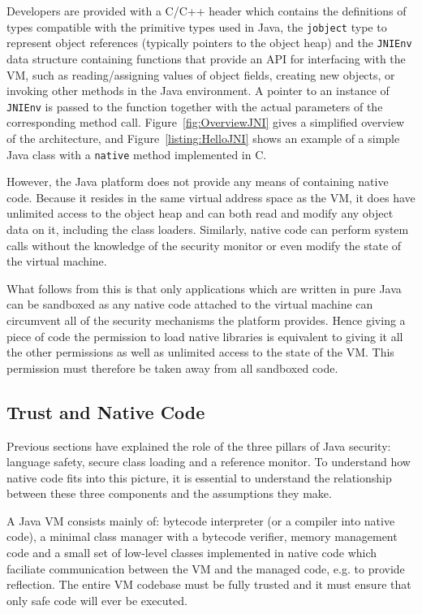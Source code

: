 \documentclass[a4paper,12pt,twoside,openright]{report}
\begin{document}
Developers are provided with a C/C++ header which contains the definitions of types compatible with the primitive types used in Java, the \texttt{jobject} type to represent object references (typically pointers to the object heap) and the \texttt{JNIEnv} data structure containing functions that provide an API for interfacing with the VM, such as reading/assigning values of object fields, creating new objects, or invoking other methods in the Java environment. A pointer to an instance of \texttt{JNIEnv} is passed to the function together with the actual parameters of the corresponding method call. Figure~\ref{fig:OverviewJNI} gives a simplified overview of the architecture, and Figure~\ref{listing:HelloJNI} shows an example of a simple Java class with a \texttt{native} method implemented in C.

However, the Java platform does not provide any means of containing native code. Because it resides in the same virtual address space as the VM, it does have unlimited access to the object heap and can both read and modify any object data on it, including the class loaders. Similarly, native code can perform system calls without the knowledge of the security monitor or even modify the state of the virtual machine.

What follows from this is that only applications which are written in pure Java can be sandboxed as any native code attached to the virtual machine can circumvent all of the security mechanisms the platform provides. Hence giving a piece of code the permission to load native libraries is equivalent to giving it all the other permissions as well as unlimited access to the state of the VM. This permission must therefore be taken away from all sandboxed code.

\subsection{Trust and Native Code}

Previous sections have explained the role of the three pillars of Java security: language safety, secure class loading and a reference monitor. To understand how native code fits into this picture, it is essential to understand the relationship between these three components and the assumptions they make.

A Java VM consists mainly of: bytecode interpreter (or a compiler into native code), a minimal class manager with a bytecode verifier, memory management code and a small set of low-level classes implemented in native code which faciliate communication between the VM and the managed code, e.g. to provide reflection. The entire VM codebase must be fully trusted and it must ensure that only safe code will ever be executed.
\end{document}
